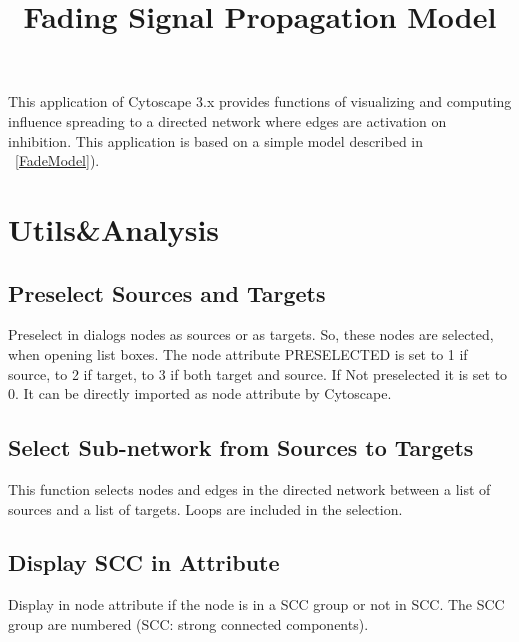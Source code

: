 \documentclass[11pt]{article}
\begin{document}
\begin{titlepage}
 
\title{\huge{\textbf{Fading Signal Propagation Model}}}
\date{}
\author{}
\maketitle
\vspace{4 cm}
\vspace{4 cm}

\end{titlepage}

\tableofcontents

\newpage
This application of Cytoscape 3.x provides functions of visualizing and computing influence spreading to a directed network where edges are activation on inhibition. This application is based on a simple model described in ~\ref{FadeModel}).

\section{Utils\&Analysis}

\subsection{Preselect Sources and Targets}
Preselect in dialogs nodes as sources or as targets. So, these nodes are selected, when opening list boxes. The node attribute PRESELECTED is set to 1 if source, to 2 if target, to 3 if both target and source. If Not preselected it is set to 0. It can be directly imported as node attribute by Cytoscape.

\subsection{Select Sub-network from Sources to Targets}
This function selects nodes and edges in the directed network between a list of sources and a list of targets.  Loops are included in the selection.

\subsection{Display SCC in Attribute}
Display in node attribute if the node is in a SCC group or not in SCC. The SCC group are numbered (SCC: strong connected components).
\end{document}

